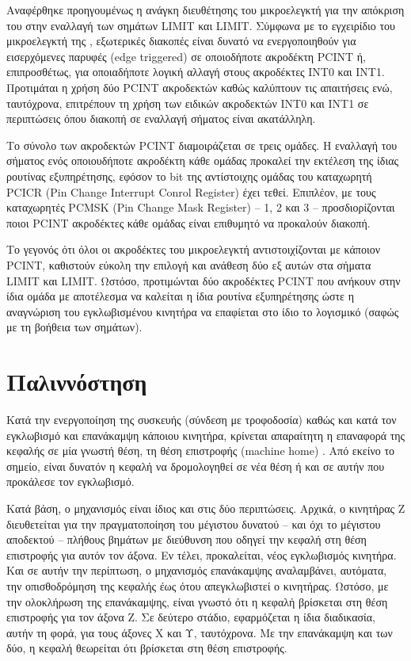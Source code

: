 Αναφέρθηκε προηγουμένως η ανάγκη διευθέτησης του μικροελεγκτή για την απόκριση
του στην εναλλαγή των σημάτων LIMIT και LIMIT. Σύμφωνα με το
εγχειρίδιο του μικροελεγκτή της \textcite[71]{atmel13}, εξωτερικές διακοπές
είναι δυνατό να ενεργοποιηθούν για εισερχόμενες παρυφές (\textenglish{edge
triggered}) σε οποιοδήποτε ακροδέκτη PCINT ή, επιπροσθέτως, για οποιαδήποτε
λογική αλλαγή στους ακροδέκτες INT0 και INT1. Προτιμάται η χρήση δύο PCINT
ακροδεκτών καθώς καλύπτουν τις απαιτήσεις ενώ, ταυτόχρονα, επιτρέπουν τη χρήση
των ειδικών ακροδεκτών INT0 και INT1 σε περιπτώσεις όπου διακοπή σε εναλλαγή
σήματος είναι ακατάλληλη.

Το σύνολο των ακροδεκτών PCINT διαμοιράζεται σε τρεις ομάδες. Η εναλλαγή του
σήματος ενός οποιουδήποτε ακροδέκτη κάθε ομάδας προκαλεί την εκτέλεση της ίδιας
ρουτίνας εξυπηρέτησης, εφόσον το bit της αντίστοιχης ομάδας του καταχωρητή PCICR
(\textenglish{Pin Change Interrupt Conrol Register}) έχει τεθεί. Επιπλέον, με
τους καταχωρητές PCMSK (\textenglish{Pin Change Mask Register}) -- 1, 2 και 3 --
προσδιορίζονται ποιοι PCINT ακροδέκτες κάθε ομάδας είναι επιθυμητό να προκαλούν
διακοπή.

Το γεγονός ότι όλοι οι ακροδέκτες του μικροελεγκτή αντιστοιχίζονται με κάποιον
PCINT, καθιστούν εύκολη την επιλογή και ανάθεση δύο εξ αυτών στα σήματα
LIMIT και LIMIT. Ωστόσο, προτιμώνται δύο ακροδέκτες PCINT που
ανήκουν στην ίδια ομάδα με αποτέλεσμα να καλείται η ίδια ρουτίνα εξυπηρέτησης
ώστε η αναγνώριση του εγκλωβισμένου κινητήρα να επαφίεται στο ίδιο το λογισμικό
(σαφώς με τη βοήθεια των σημάτων).

\section{Παλιννόστηση}
\label{sec:motor:homing}

Κατά την ενεργοποίηση της συσκευής (σύνδεση με τροφοδοσία) καθώς και κατά τον
εγκλωβισμό και επανάκαμψη κάποιου κινητήρα, κρίνεται απαραίτητη η επαναφορά της
κεφαλής σε μία γνωστή θέση, τη θέση επιστροφής (\textenglish{machine home})
\parencite[99]{albert11}. Από εκείνο το σημείο, είναι δυνατόν η κεφαλή να
δρομολογηθεί σε νέα θέση ή και σε αυτήν που προκάλεσε τον εγκλωβισμό.

Κατά βάση, ο μηχανισμός είναι ίδιος και στις δύο περιπτώσεις. Αρχικά, ο
κινητήρας Z διευθετείται για την πραγματοποίηση του μέγιστου δυνατού -- και όχι
το μέγιστου αποδεκτού -- πλήθους βημάτων με διεύθυνση που οδηγεί την κεφαλή στη
θέση επιστροφής για αυτόν τον άξονα. Εν τέλει, προκαλείται, νέος εγκλωβισμός
κινητήρα. Και σε αυτήν την περίπτωση, ο μηχανισμός επανάκαμψης αναλαμβάνει,
αυτόματα, την οπισθοδρόμηση της κεφαλής έως ότου απεγκλωβιστεί ο κινητήρας.
Ωστόσο, με την ολοκλήρωση της επανάκαμψης, είναι γνωστό ότι η κεφαλή βρίσκεται
στη θέση επιστροφής για τον άξονα Z. Σε δεύτερο στάδιο, εφαρμόζεται η ίδια
διαδικασία, αυτήν τη φορά, για τους άξονες X και Υ, ταυτόχρονα. Με την
επανάκαμψη και των δύο, η κεφαλή θεωρείται ότι βρίσκεται στη θέση επιστροφής.

